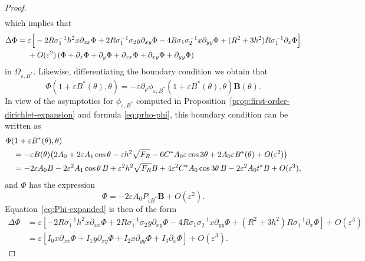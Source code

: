 \documentclass[10pt,a4paper]{amsart}
\begin{document}
\begin{proof}
\begin{equation*}
\begin{split}
\end{split}
\end{equation*}
which implies that
\begin{align}\label{eq:Phi-expanded}
\Delta\Phi={}&\varepsilon\Big[-2R\sigma_1^{-1}h^2x\partial_{xx}\Phi
+2 R\sigma_1^{-1}\sigma_2y\partial_{xy}\Phi
-4R\sigma_1\sigma_2^{-1}x\partial_{yy}\Phi +(R^2+3h^2)R\sigma_1^{-1}\partial_x\Phi\Big] \notag\\
&
+O(\varepsilon^2)\left (\Phi+\partial_{x}\Phi+\partial_{y}\Phi+\partial_{xx}\Phi+\partial_{xy}\Phi+\partial_{yy}\Phi\right )
\end{align} 
in $ \varOmega_{\varepsilon,B^*} $. 	Likewise, differentiating the boundary condition we obtain that 
\begin{equation*} 
 \Phi(1+\varepsilon B^*(\theta),\theta)
=-\varepsilon\partial_\rho\phi_{\varepsilon,B^*}(1+\varepsilon B^*(\theta),\theta)\mathbf{B}(\theta) .
\end{equation*}
In view of the asymptotics for $ \phi_{\varepsilon,B^*}$ computed in Proposition~\ref{prop:first-order-dirichlet-expansion} and formula \eqref{eq:prho-phi}, this boundary condition can be written as 
 \begin{align*}%
 &\Phi(1+\varepsilon B^*(\theta),\theta)\notag\\
 &\quad=-\varepsilon \textbf{B}(\theta)\bigl(2A_0+2\varepsilon A_1\cos\theta-\varepsilon h^2\sqrt{F_R}-6C^*A_0\varepsilon \cos3\theta+2A_0\varepsilon B^*(\theta)+O(\varepsilon^2)\bigr)\notag\\
 &\quad=-2\varepsilon A_0  \textbf{B}-2\varepsilon^2A_1\cos\theta\, \textbf{B}
 +\varepsilon^2h^2\sqrt{F_R} \textbf{B}+4\varepsilon^2C^*A_0\cos3\theta\, \textbf{B}-2\varepsilon^2A_0 t^*\textbf{B}+O(\varepsilon^3),
 \end{align*}
and  $ \Phi $ has the expression
 \begin{equation*}\label{eq:Phi-leading}
 \Phi=-2\varepsilon A_0P_{\varepsilon B^*} \textbf{B}+O(\varepsilon^2).
 \end{equation*}
 Equation~\eqref{eq:Phi-expanded} is then of the form
\begin{align*} 
\Delta\Phi&=\varepsilon\left [-2R\sigma_1^{-1}h^2x\partial_{xx}\Phi
+2 R\sigma_1^{-1}\sigma_2y\partial_{xy}\Phi
-4R\sigma_1\sigma_2^{-1}x\partial_{yy}\Phi +(R^2+3h^2)R\sigma_1^{-1}\partial_x\Phi\right ]  
+O(\varepsilon^3)\\
&=\varepsilon\left [I_0x\partial_{xx}\Phi
+I_1y\partial_{xy}\Phi
+I_2x\partial_{yy}\Phi +I_3\partial_x\Phi\right ]  
+O(\varepsilon^3).

\end{align*}
\end{proof}
\end{document}
